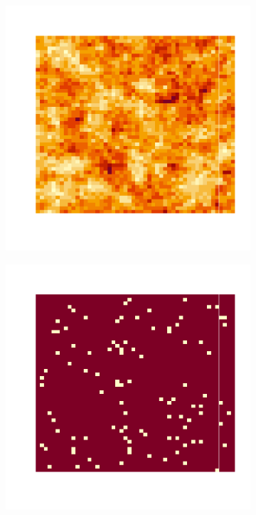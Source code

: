 \documentclass[10pt]{article} %
\begin{document}
\begin{figure}[h!]
    \centering
    \begin{subfigure}[b]{0.3\textwidth}
        \centering
        \includegraphics[width=\textwidth]{media/gauss_field_start.png}
        \caption{}
        \label{gauss plasma}
    \end{subfigure}
    \hfill
    \begin{subfigure}[b]{0.3\textwidth}
        \centering
        \includegraphics[width=\textwidth]{media/gauss_field_observations.png}

\end{subfigure}
\end{figure}
\end{document}
